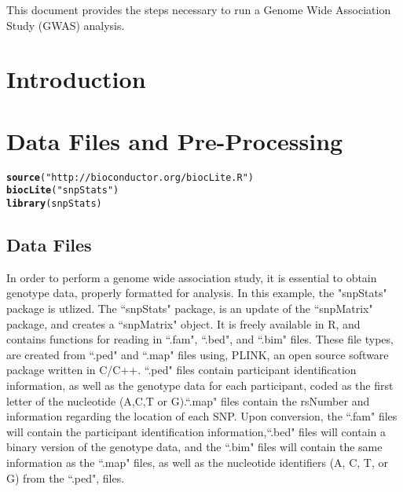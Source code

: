 \documentclass[11pt]{article}\usepackage[]{graphicx}\usepackage[]{color}
\makeatletter
\newcommand{\hlstr}[1]{\textcolor[rgb]{0.192,0.494,0.8}{#1}}%
\newcommand{\hlstd}[1]{\textcolor[rgb]{0.345,0.345,0.345}{#1}}%
\newcommand{\hlkwd}[1]{\textcolor[rgb]{0.737,0.353,0.396}{\textbf{#1}}}%
\newenvironment{kframe}{%
 \def\at@end@of@kframe{}%
 \ifinner\ifhmode%
  \def\at@end@of@kframe{\end{minipage}}%
  \begin{minipage}{\columnwidth}%
 \fi\fi%
 \def\FrameCommand##1{\hskip\@totalleftmargin \hskip-\fboxsep
 \colorbox{shadecolor}{##1}\hskip-\fboxsep
     \hskip-\linewidth \hskip-\@totalleftmargin \hskip\columnwidth}%
 \MakeFramed {\advance\hsize-\width
   \@totalleftmargin\z@ \linewidth\hsize
   \@setminipage}}%
 {\par\unskip\endMakeFramed%
 \at@end@of@kframe}
\newenvironment{knitrout}{}{} %
\makeatother
\begin{document}
This document provides the steps necessary to run a Genome Wide Association Study (GWAS) analysis.
\section{Introduction}
\section{Data Files and Pre-Processing}



\begin{knitrout}
\color{fgcolor}\begin{kframe}
\begin{alltt}
\hlkwd{source}\hlstd{(}\hlstr{"http://bioconductor.org/biocLite.R"}\hlstd{)}
\hlkwd{biocLite}\hlstd{(}\hlstr{"snpStats"}\hlstd{)}
\hlkwd{library}\hlstd{(snpStats)}
\end{alltt}
\end{kframe}
\end{knitrout}

\subsection{Data Files}
In order to perform a genome wide association study, it is essential to obtain genotype data, properly formatted for analysis.  In this example, the "snpStats" package is utlized. The  ``snpStats" package, is an update of the ``snpMatrix" package, and creates a ``snpMatrix" object. It is freely available in R, and contains functions for reading in ``.fam", ``.bed", and ``.bim" files.  These file types, are created from ``.ped" and ``.map" files using, PLINK, an open source software package written in C/C++.  ``.ped" files contain participant identification information, as well as the genotype data for each participant, coded as the first letter of the nucleotide (A,C,T or G).``.map" files contain the rsNumber and information regarding the location of each SNP.  Upon conversion, the  ``.fam" files will contain the participant identification information,``.bed" files will contain a binary version of the genotype data, and the ``.bim" files will contain the same information as the ``.map" files, as well as the nucleotide identifiers (A, C, T, or G) from the ``.ped", files.  
\end{document}
